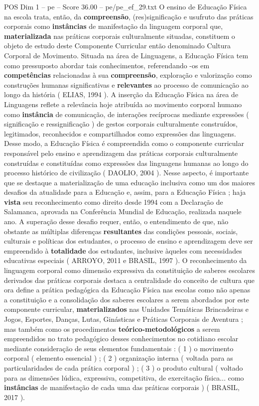 \begin{textsample}{POS Dim 1 – pe – Score 36.00 – pe/pe\_ef\_29.txt}
O ensino de Educação Física na escola trata, então, da \textbf{compreensão}, (res)significação e usufruto das práticas corporais como \textbf{instâncias} de manifestação da linguagem corporal que, \textbf{materializada} nas práticas corporais culturalmente situadas, constituem o objeto de estudo deste Componente Curricular então denominado Cultura Corporal de Movimento.
Situada na área de Linguagens, a Educação Física tem como pressuposto abordar tais conhecimentos, referendando -os em \textbf{competências} relacionadas à sua \textbf{compreensão}, exploração e valorização como construções humanas significativas e \textbf{relevantes} ao processo de comunicação ao longo da história ( ELIAS, 1994 ).
A inserção da Educação Física na área de Linguagens reflete a relevância hoje atribuída ao movimento corporal humano como \textbf{instância} de comunicação, de interações recíprocas mediante expressões ( significação e ressignificação ) de gestos corporais culturalmente construídos, legitimados, reconhecidos e compartilhados como expressões das linguagens.
Desse modo, a Educação Física é compreendida como o componente curricular responsável pelo ensino e aprendizagem das práticas corporais culturalmente construídas e constituídas como expressões das linguagens humanas ao longo do processo histórico de civilização ( DAOLIO, 2004 ).
Nesse aspecto, é importante que se destaque a materialização de uma educação inclusiva como um dos maiores desafios da atualidade para a Educação e, assim, para a Educação Física ; haja \textbf{vista} seu reconhecimento como direito desde 1994 com a Declaração de Salamanca, aprovada na Conferência Mundial de Educação, realizada naquele ano.
A superação desse desafio requer, então, o entendimento de que, não obstante as múltiplas diferenças \textbf{resultantes} das condições pessoais, sociais, culturais e políticas dos estudantes, o processo de ensino e aprendizagem deve ser empreendido à \textbf{totalidade} dos estudantes, inclusive àqueles com necessidades educativas especiais ( ARROYO, 2011 e BRASIL, 1997 ).
O reconhecimento da linguagem corporal como dimensão expressiva da constituição de saberes escolares derivados das práticas corporais destaca a centralidade do conceito de cultura que ora define a prática pedagógica da Educação Física nas escolas como não apenas a constituição e a consolidação dos saberes escolares a serem abordados por este componente curricular, \textbf{materializados} nas Unidades Temáticas Brincadeiras e Jogos, Esportes, Danças, Lutas, Ginásticas e Práticas Corporais de Aventura ; mas também como os procedimentos \textbf{teórico-metodológicos} a serem empreendidos no trato pedagógico desses conhecimentos no cotidiano escolar mediante consideração de seus elementos fundamentais : ( 1 ) o movimento corporal ( elemento essencial ) ; ( 2 ) organização interna ( voltada para as particularidades de cada prática corporal ) ; ( 3 ) o produto cultural ( voltado para as dimensões lúdica, expressiva, competitiva, de exercitação física... como \textbf{instâncias} de manifestação de cada uma das práticas corporais ) ( BRASIL, 2017 ).

\end{textsample}
